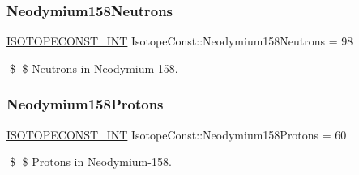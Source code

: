 \subsubsection{\texorpdfstring{Neodymium158\+Neutrons}{Neodymium158Neutrons}}
{\footnotesize\ttfamily \mbox{\hyperlink{group___isotope_const-_macros_ga5f18360b3e99483a35c32d789e62621c}{I\+S\+O\+T\+O\+P\+E\+C\+O\+N\+S\+T\+\_\+\+I\+NT}} Isotope\+Const\+::\+Neodymium158\+Neutrons = 98}

\$ \$ Neutrons in Neodymium-\/158. \mbox{\label{group___isotope_const-_neodymium-_nd158_gaa19f417c01f951d826f9e99a42604c4d}} 
\subsubsection{\texorpdfstring{Neodymium158\+Protons}{Neodymium158Protons}}
{\footnotesize\ttfamily \mbox{\hyperlink{group___isotope_const-_macros_ga5f18360b3e99483a35c32d789e62621c}{I\+S\+O\+T\+O\+P\+E\+C\+O\+N\+S\+T\+\_\+\+I\+NT}} Isotope\+Const\+::\+Neodymium158\+Protons = 60}

\$ \$ Protons in Neodymium-\/158. 